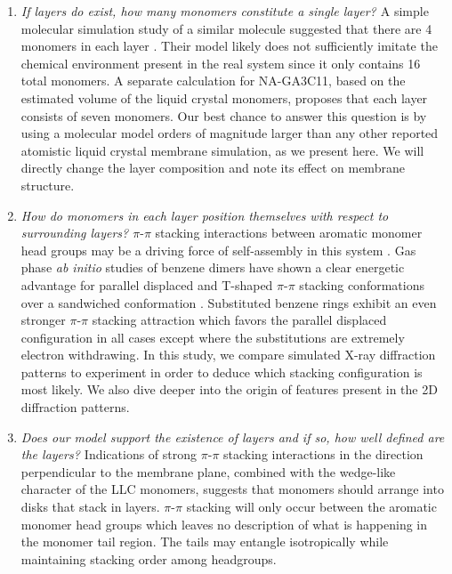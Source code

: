\documentclass[journal=jpcbfk,manusciprt=article]{achemso}
\begin{document}
  \begin{enumerate}

  \item \textit{If layers do exist, how many monomers constitute a single layer? \label{point:monomernum}} 
  A simple molecular simulation study of a similar molecule suggested that
  there are 4 monomers in each layer \cite{zhu_methacrylated_2006}. Their model
  likely does not sufficiently imitate the chemical environment present in the
  real system since it only contains 16 total monomers. A separate calculation
  for NA-GA3C11, based on the estimated volume of the liquid crystal monomers,
  proposes that each layer consists of seven
  monomers\cite{resel_structural_2000}. Our best chance to answer this question
  is by using a molecular model orders of magnitude larger than any other
  reported atomistic liquid crystal membrane simulation, as we present here. We
  will directly change the layer composition and note its effect on membrane
  structure.

  \item \textit{How do monomers in each layer position themselves with respect to
  surrounding layers? \label{point:orientation}}
  $\pi$-$\pi$ stacking interactions between aromatic monomer head groups may be
  a driving force of self-assembly in this system \cite{gazit_possible_2002}. Gas
  phase \textit{ab initio} studies of benzene dimers have shown a clear energetic
  advantage for parallel displaced and T-shaped $\pi$-$\pi$ stacking
  conformations over a sandwiched conformation \cite{sinnokrot_estimates_2002}.
  Substituted benzene rings exhibit an even stronger $\pi$-$\pi$ stacking
  attraction which favors the parallel displaced configuration in all cases
  except where the substitutions are extremely electron
  withdrawing\cite{waller_hybrid_2006,ringer_effect_2006}. In this study, we
  compare simulated X-ray diffraction patterns to experiment in order to deduce
  which stacking configuration is most likely. We also dive deeper into the
  origin of features present in the 2D diffraction patterns.  

  \item \textit{Does our model support the existence of layers and if so, how well
  defined are the layers? \label{point:layers}} 
  Indications of strong $\pi$-$\pi$ stacking interactions in the direction
  perpendicular to the membrane plane, combined with the wedge-like character of
  the LLC monomers, suggests that monomers should arrange into disks that stack in
  layers. $\pi$-$\pi$ stacking will only occur between the aromatic
  monomer head groups which leaves no description of what is happening in the
  monomer tail region. The tails may entangle isotropically while maintaining
  stacking order among headgroups. 


\end{enumerate}
\end{document}
